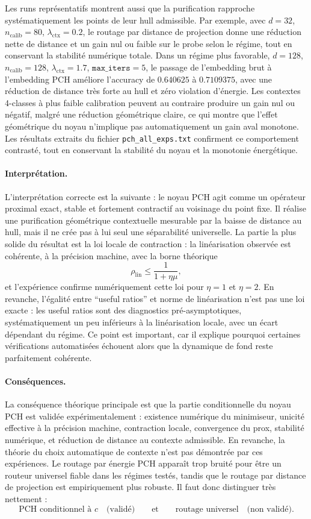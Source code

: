 Les runs représentatifs montrent aussi que la purification rapproche systématiquement les points de leur hull admissible. Par exemple, avec \(d=32\), \(n_{\mathrm{calib}}=80\), \(\lambda_{\mathrm{ctx}}=0.2\), le routage par distance de projection donne une réduction nette de distance et un gain nul ou faible sur le probe selon le régime, tout en conservant la stabilité numérique totale. Dans un régime plus favorable, \(d=128\), \(n_{\mathrm{calib}}=128\), \(\lambda_{\mathrm{ctx}}=1.7\), \(\texttt{max\_iters}=5\), le passage de l’embedding brut à l’embedding PCH améliore l’accuracy de \(0.640625\) à \(0.7109375\), avec une réduction de distance très forte au hull et zéro violation d’énergie. Les contextes 4-classes à plus faible calibration peuvent au contraire produire un gain nul ou négatif, malgré une réduction géométrique claire, ce qui montre que l’effet géométrique du noyau n’implique pas automatiquement un gain aval monotone. Les résultats extraits du fichier \texttt{pch\_all\_exps.txt} confirment ce comportement contrasté, tout en conservant la stabilité du noyau et la monotonie énergétique. 

\paragraph{Interprétation.}
L’interprétation correcte est la suivante : le noyau PCH agit comme un opérateur proximal exact, stable et fortement contractif au voisinage du point fixe. Il réalise une purification géométrique contextuelle mesurable par la baisse de distance au hull, mais il ne crée pas à lui seul une séparabilité universelle. La partie la plus solide du résultat est la loi locale de contraction : la linéarisation observée est cohérente, à la précision machine, avec la borne théorique
\[
\rho_{\mathrm{lin}}\le \frac{1}{1+\eta\mu},
\]
et l’expérience confirme numériquement cette loi pour \(\eta=1\) et \(\eta=2\). En revanche, l’égalité entre “useful ratios” et norme de linéarisation n’est pas une loi exacte : les useful ratios sont des diagnostics pré-asymptotiques, systématiquement un peu inférieurs à la linéarisation locale, avec un écart dépendant du régime. Ce point est important, car il explique pourquoi certaines vérifications automatisées échouent alors que la dynamique de fond reste parfaitement cohérente. 

\paragraph{Conséquences.}
La conséquence théorique principale est que la partie conditionnelle du noyau PCH est validée expérimentalement : existence numérique du minimiseur, unicité effective à la précision machine, contraction locale, convergence du prox, stabilité numérique, et réduction de distance au contexte admissible. En revanche, la théorie du choix automatique de contexte n’est pas démontrée par ces expériences. Le routage par énergie PCH apparaît trop bruité pour être un routeur universel fiable dans les régimes testés, tandis que le routage par distance de projection est empiriquement plus robuste. Il faut donc distinguer très nettement :
\[
\text{PCH conditionnel à }c
\quad\text{(validé)}
\qquad\text{et}\qquad
\text{routage universel}
\quad\text{(non validé).}
\]

